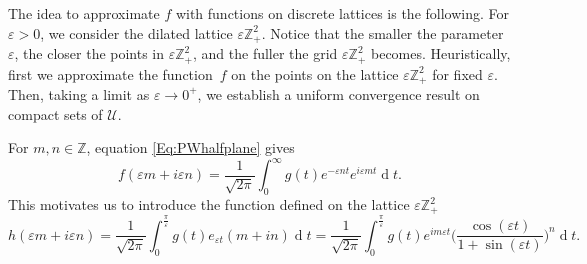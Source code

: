 \documentclass[12pt,a4paper,reqno]{amsart}
\theoremstyle{definition}
\theoremstyle{definition}\newtheorem{defn}[thm]{Definition}
\begin{document}
    The idea to approximate $f$ with functions on discrete lattices is the following. For $\varepsilon>0$, we consider the dilated lattice $\varepsilon\mathbb Z^2_+$. Notice that the smaller the parameter $\varepsilon$, the closer the points in $\varepsilon\mathbb Z^2_+$, and the fuller the grid $\varepsilon\mathbb Z^2_+$ becomes. Heuristically, first we approximate the function~$f$ on the points on the lattice $\varepsilon\mathbb Z^2_+$ for fixed $\varepsilon.$ Then, taking a limit as $\varepsilon\to 0^+$, we establish a uniform convergence result on compact sets of $\mathcal{U}$. 
    
    For $m,n\in\mathbb{Z}$, equation \eqref{Eq:PWhalfplane} gives
    \[
    f(\varepsilon m+i\varepsilon n)=\frac{1}{\sqrt{2\pi}} \int_0^\infty g(t) e^{-\varepsilon nt} e^{i\varepsilon mt}\operatorname{d}\! t.
    \]
    This motivates us to introduce the function defined on the lattice $\varepsilon\mathbb{Z}^2_+$
    \begin{equation}\label{eq:hvarepsilon}
    h(\varepsilon m+i\varepsilon n)=\frac{1}{\sqrt{2\pi}}\int_0^{\frac\pi\varepsilon}g(t)e_{\varepsilon t}(m+in)\operatorname{d}\!t= \frac{1}{\sqrt{2\pi}}\int_0^{\frac\pi\varepsilon} g(t) e^{im\varepsilon t}\Big(\frac{\cos(\varepsilon t)}{1+\sin(\varepsilon t)}\Big)^{n} \operatorname{d}\!t.
    \end{equation}
    
\end{document}
